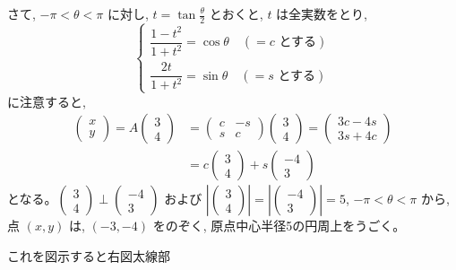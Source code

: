 \documentclass[../main.tex]{subfiles}
\begin{document}
さて, $-\pi < \theta < \pi$ に対し, $t = \tan\frac{\theta}{2}$ とおくと, $t$ は全実数をとり,
\[
  \begin{cases}
    \dfrac{1-t^2}{1+t^2} = \cos\theta \quad (= c \text{ とする}) \\[10pt]
    \dfrac{2t}{1+t^2} = \sin\theta \quad (= s \text{ とする})
  \end{cases}
\]
に注意すると,
\begin{align*}
  \begin{pmatrix} x \\ y
  \end{pmatrix} = A
  \begin{pmatrix} 3 \\ 4
  \end{pmatrix} &=
  \begin{pmatrix} c & -s \\ s & c
  \end{pmatrix}
  \begin{pmatrix} 3 \\ 4
  \end{pmatrix} =
  \begin{pmatrix} 3c-4s \\ 3s+4c
  \end{pmatrix} \\
  &= c
  \begin{pmatrix} 3 \\ 4
  \end{pmatrix} + s
  \begin{pmatrix} -4 \\ 3
  \end{pmatrix}
\end{align*}
となる。$
\begin{pmatrix} 3 \\ 4
\end{pmatrix} \perp
\begin{pmatrix} -4 \\ 3
\end{pmatrix}$ および $\left|
\begin{pmatrix} 3 \\ 4
\end{pmatrix} \right| = \left|
\begin{pmatrix} -4 \\ 3
\end{pmatrix} \right| = 5$, $-\pi < \theta < \pi$ から, 点 $(x,y)$ は, $(-3,-4)$ をのぞく, 原点中心半径5の円周上をうごく。

これを図示すると右図太線部
\begin{center}
\end{center}
\end{document}
